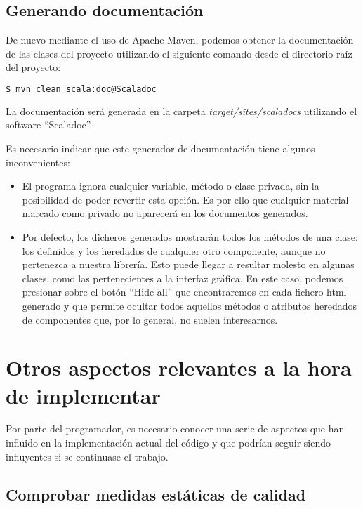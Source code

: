 \subsection{Generando documentación}\label{subsec:documentacion}

De nuevo mediante el uso de Apache Maven, podemos obtener la documentación de las clases del proyecto utilizando el siguiente comando desde el directorio raíz del proyecto:

\begin{lstlisting}[language=bash]
$ mvn clean scala:doc@Scaladoc
\end{lstlisting}

La documentación será generada en la carpeta \textit{target/sites/scaladocs} utilizando el software ``Scaladoc''.

Es necesario indicar que este generador de documentación tiene algunos inconvenientes:
\begin{itemize}
\item El programa ignora cualquier variable, método o clase privada, sin la posibilidad de poder revertir esta opción. Es por ello que cualquier material marcado como privado no aparecerá en los documentos generados.
\item Por defecto, los dicheros generados mostrarán todos los métodos de una clase: los definidos y los heredados de cualquier otro componente, aunque no pertenezca a nuestra librería. Esto puede llegar a resultar molesto en algunas clases, como las pertenecientes a la interfaz gráfica. En este caso, podemos presionar sobre el botón ``Hide all'' que encontraremos en cada fichero html generado y que permite ocultar todos aquellos métodos o atributos heredados de componentes que, por lo general, no suelen interesarnos.
\end{itemize}
 


\section{Otros aspectos relevantes a la hora de implementar}

Por parte del programador, es necesario conocer una serie de aspectos que han influido en la implementación actual del código y que podrían seguir siendo influyentes si se continuase el trabajo.

\subsection{Comprobar medidas estáticas de calidad}

